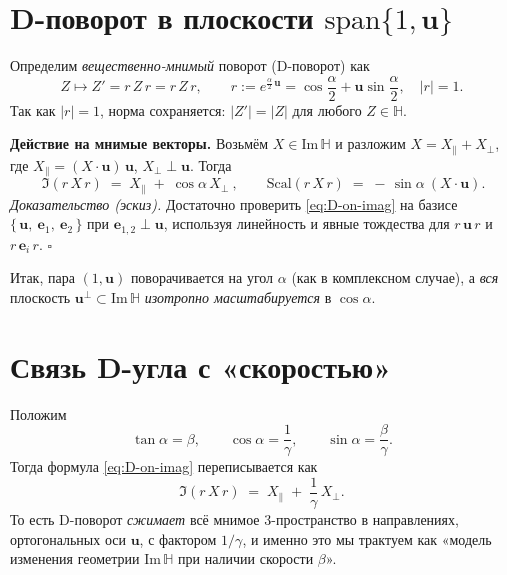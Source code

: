 \documentclass[11pt,a4paper]{article}
\newcommand{\HH}{\mathbb{H}}
\newcommand{\ImH}{\mathrm{Im}\,\mathbb{H}}
\newcommand{\Scal}{\mathrm{Scal}}
\newcommand{\uu}{\mathbf{u}}        %
\newcommand{\Sand}[2]{#1\,#2\,#1}   %
\begin{document}
\section{D-поворот в плоскости \texorpdfstring{\(\mathrm{span}\{1,\uu\}\)}{span\{1,u\}}}
Определим \emph{вещественно-мнимый} поворот (D-поворот) как
\begin{equation}
  Z \mapsto Z' = \Sand{r}{Z} = r\,Z\,r,\qquad
  r:=e^{\frac{\alpha}{2}\,\uu}=\cos\frac{\alpha}{2}+\uu\sin\frac{\alpha}{2},\quad |r|=1.
\end{equation}
Так как \(|r|=1\), норма сохраняется: \(|Z'|=|Z|\) для любого \(Z\in\HH\).

\medskip
\noindent\textbf{Действие на мнимые векторы.}
Возьмём \(X\in\ImH\) и разложим \(X=X_\parallel+X_\perp\), где
\(X_\parallel=(X\!\cdot\!\uu)\,\uu\), \(X_\perp\perp\uu\).
Тогда
\begin{equation}\label{eq:D-on-imag}
  \boxed{\ \Im(\Sand{r}{X}) \;=\; X_\parallel \;+\; \cos\alpha\,X_\perp\ },\qquad
  \Scal(\Sand{r}{X}) \;=\; -\,\sin\alpha\ (X\!\cdot\!\uu).
\end{equation}
\emph{Доказательство (эскиз).}
Достаточно проверить \eqref{eq:D-on-imag} на базисе
\(\{\,\uu,\ \mathbf e_1,\ \mathbf e_2\,\}\) при \(\mathbf e_{1,2}\perp\uu\),
используя линейность и явные тождества для \(r\,\uu\,r\) и \(r\,\mathbf e_i\,r\).
\(\square\)

\medskip
\noindent Итак, пара \((1,\uu)\) поворачивается на угол \(\alpha\) (как в комплексном случае),
а \emph{вся} плоскость \(\uu^\perp\subset\ImH\) \emph{изотропно масштабируется} в \(\cos\alpha\).

\section{Связь D-угла с «скоростью»}
Положим
\begin{equation}
  \tan\alpha=\beta,\qquad
  \cos\alpha=\frac{1}{\gamma},\qquad
  \sin\alpha=\frac{\beta}{\gamma}.
\end{equation}
Тогда формула \eqref{eq:D-on-imag} переписывается как
\begin{equation}\label{eq:gamma-squeeze}
  \Im(\Sand{r}{X}) \;=\; X_\parallel \;+\; \frac{1}{\gamma}\,X_\perp.
\end{equation}
То есть D-поворот \emph{сжимает} всё мнимое 3-пространство в направлениях,
ортогональных оси \(\uu\), с фактором \(1/\gamma\), и именно это мы трактуем
как «модель изменения геометрии \(\ImH\) при наличии скорости \(\beta\)».
\end{document}

